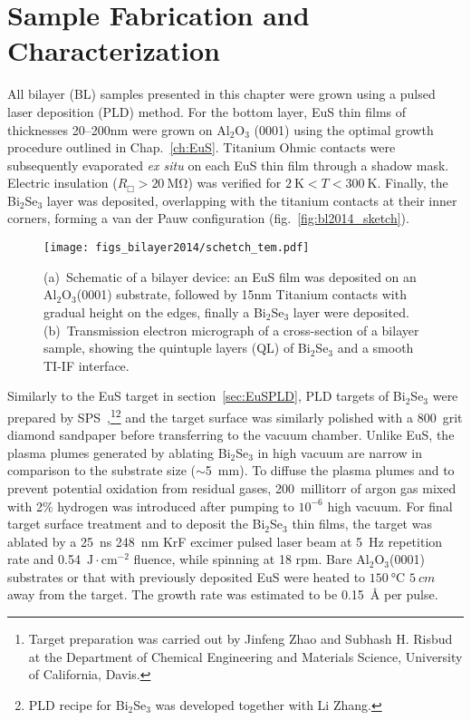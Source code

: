\section{Sample Fabrication and Characterization}\label{sec:bilayer2014_char}
All bilayer (BL) samples presented in this chapter were grown using a pulsed laser deposition (PLD) method. For the bottom layer, EuS thin films of thicknesses 20--200nm were grown on Al$_2$O$_3$ (0001) using the optimal growth procedure outlined in Chap.~\ref{ch:EuS}. Titanium Ohmic contacts were subsequently evaporated {\it ex situ} on each EuS thin film through a shadow mask. Electric insulation ($R_\Box > 20~\mathrm{M\Omega}$) was verified for $2~\mathrm{K}<T<300~\mathrm{K}$. Finally, the Bi$_2$Se$_3$ layer was deposited, overlapping with the titanium contacts at their inner corners, forming a van der Pauw configuration (fig.~\ref{fig:bl2014_sketch}).%
%
\begin{figure}[h]%
\centering%
\subfloat{\label{fig:bl2014_sketch}}%
\subfloat{\label{fig:bl2014_TEM}}%
\texttt{[image: figs\_bilayer2014/schetch\_tem.pdf]}%
\caption[Schematic and cross-section TEM of Bi$_2$Se$_3$ / EuS thin film bilayers]{(a)~Schematic of a bilayer device: an EuS film was deposited on an Al$_2$O$_3$(0001) substrate, followed by 15nm Titanium contacts with gradual height on the edges, finally a Bi$_2$Se$_3$ layer were deposited. (b)~Transmission electron micrograph of a cross-section of a bilayer sample, showing the quintuple layers (QL) of Bi$_2$Se$_3$ and a smooth TI-IF interface.}%
\end{figure}%

Similarly to the EuS target in section~\ref{sec:EuSPLD}, PLD targets of Bi$_2$Se$_3$ were prepared by SPS~\cite{Jinfeng2, Subhash1},\footnote{Target preparation was carried out by Jinfeng Zhao and Subhash H. Risbud at the Department of Chemical Engineering and Materials Science, University of California, Davis.}\footnote{PLD recipe for Bi$_2$Se$_3$ was developed together with Li Zhang.} and the target surface was similarly polished with a 800~grit diamond sandpaper before transferring to the vacuum chamber. Unlike EuS, the plasma plumes generated by ablating Bi$_2$Se$_3$ in high vacuum are narrow in comparison to the substrate size ($\sim$5~mm). To diffuse the plasma plumes and to prevent potential oxidation from residual gases, 200~millitorr of argon gas mixed with 2\% hydrogen was introduced after pumping to $10^{-6}$ high vacuum. For final target surface treatment and to deposit the Bi$_2$Se$_3$ thin films, the target was ablated by a 25~ns 248~nm KrF excimer pulsed laser beam at 5~Hz repetition rate and 0.54~$\mathrm{J\cdot{}cm^{-2}}$ fluence, while spinning at 18 rpm. Bare Al$_2$O$_3$(0001) substrates or that with previously deposited EuS were heated to $\SI{150}{\degreeCelsius}$ $\SI{5}{cm}$ away from the target. The growth rate was estimated to be 0.15~\AA{} per pulse.

